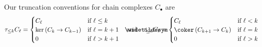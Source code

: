 \documentclass[a4paper,parskip=half,numbers=enddot, DIV=12]{scrreprt}
\begin{document}
Our truncation conventions for chain complexes $C_\bullet$ are
\begin{align*}
\tau_{\leq k}C_\ell=\begin{cases}
C_\ell & \text{if }\ell\leq k\\
\ker\left(C_k\morphism C_{k-1}\right) & \text{if }\ell=k+1\\
0 & \text{if }\ell>k+1
\end{cases}\quad\text{and}\quad
\snake{\tau}_{\leq k}C_\ell=\begin{cases}
C_\ell & \text{if }\ell< k\\
\coker\left(C_{k+1}\morphism C_k\right) & \text{if }\ell=k\\
0 & \text{if }\ell>k
\end{cases}
\end{align*}
\end{document}
